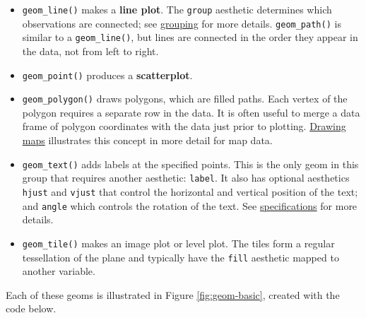 \begin{itemize}
\itemsep1pt\parskip0pt
\item
  \texttt{geom\_line()} makes a \textbf{line plot}. The \texttt{group}
  aesthetic determines which observations are connected; see
  \hyperref[sub:grouping]{grouping} for more details.
  \texttt{geom\_path()} is similar to a \texttt{geom\_line()}, but lines
  are connected in the order they appear in the data, not from left to
  right.   
\item
  \texttt{geom\_point()} produces a \textbf{scatterplot}.
\item
  \texttt{geom\_polygon()} draws polygons, which are filled paths. Each
  vertex of the polygon requires a separate row in the data. It is often
  useful to merge a data frame of polygon coordinates with the data just
  prior to plotting. \hyperref[sec:maps]{Drawing maps} illustrates this
  concept in more detail for map data. 
\item
  \texttt{geom\_text()} adds labels at the specified points. This is the
  only geom in this group that requires another aesthetic:
  \texttt{label}. It also has optional aesthetics \texttt{hjust} and
  \texttt{vjust} that control the horizontal and vertical position of
  the text; and \texttt{angle} which controls the rotation of the text.
  See \hyperref[cha:specifications]{specifications} for more details.
   
\item
  \texttt{geom\_tile()} makes an image plot or level plot. The tiles
  form a regular tessellation of the plane and typically have the
  \texttt{fill} aesthetic mapped to another variable. 
   
\end{itemize}

Each of these geoms is illustrated in Figure \ref{fig:geom-basic},
created with the code below.

